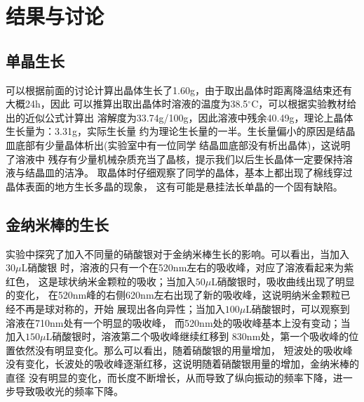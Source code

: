 \documentclass[a4paper,zihao=5,UTF8]{ctexart}
\newcommand{\mr}[1]{\mathrm{#1}}
\def\celsius{^{\circ}\mr{C}}
\begin{document}
    \section{结果与讨论}
    \subsection{单晶生长}
    可以根据前面的讨论计算出晶体生长了1.60g，由于取出晶体时距离降温结束还有大概24h，因此
    可以推算出取出晶体时溶液的温度为38.5$\celsius$，可以根据实验教材给出的近似公式计算出
    溶解度为33.74g/100g，因此溶液中残余40.49g，理论上晶体生长量为：3.31g，实际生长量
    约为理论生长量的一半。生长量偏小的原因是结晶皿底部有少量晶体析出(实验室中有一位同学
    结晶皿底部没有析出晶体)，这说明了溶液中
    残存有少量机械杂质充当了晶核，提示我们以后生长晶体一定要保持溶液与结晶皿的洁净。
    取晶体时仔细观察了同学的晶体，基本上都出现了棉线穿过晶体表面的地方生长多晶的现象，
    这有可能是悬挂法长单晶的一个固有缺陷。
    \subsection{金纳米棒的生长}
    实验中探究了加入不同量的硝酸银对于金纳米棒生长的影响。可以看出，当加入$30\mu$L硝酸银
    时，溶液的只有一个在520nm左右的吸收峰，对应了溶液看起来为紫红色，
    这是球状纳米金颗粒的吸收；当加入$50\mu$L硝酸银时，吸收曲线出现了明显的变化，
    在520nm峰的右侧620nm左右出现了新的吸收峰，这说明纳米金颗粒已经不再是球对称的，开始
    展现出各向异性；当加入$100\mu$L硝酸银时，可以观察到溶液在710nm处有一个明显的吸收峰，
    而520nm处的吸收峰基本上没有变动；当加入$150\mu$L硝酸银时，溶液第二个吸收峰继续红移到
    830nm处，第一个吸收峰的位置依然没有明显变化。那么可以看出，随着硝酸银的用量增加，
    短波处的吸收峰没有变化，长波处的吸收峰逐渐红移，这说明随着硝酸银用量的增加，金纳米棒的直径
    没有明显的变化，而长度不断增长，从而导致了纵向振动的频率下降，进一步导致吸收光的频率下降。

    
	
\end{document}
